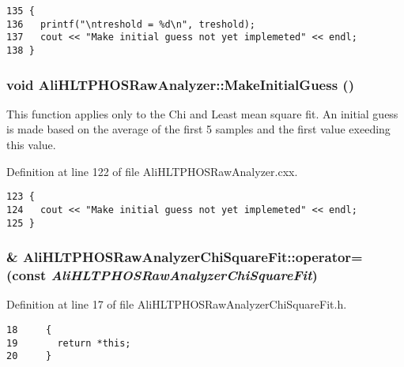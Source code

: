 \footnotesize\begin{verbatim}135 {
136   printf("\ntreshold = %d\n", treshold);
137   cout << "Make initial guess not yet implemeted" << endl;  
138 }
\end{verbatim}\normalsize 


\subsubsection{\setlength{\rightskip}{0pt plus 5cm}void Ali\-HLTPHOSRaw\-Analyzer::Make\-Initial\-Guess ()\hspace{0.3cm}{\tt  [inherited]}}\label{classAliHLTPHOSRawAnalyzer_AliHLTPHOSRawAnalyzerPeakFindera14}


This function applies only to the Chi and Least mean square fit. An initial guess is made based on the average of the first 5 samples and the first value exeeding this value. 

Definition at line 122 of file Ali\-HLTPHOSRaw\-Analyzer.cxx.

\footnotesize\begin{verbatim}123 {
124   cout << "Make initial guess not yet implemeted" << endl;
125 }
\end{verbatim}\normalsize 


\subsubsection{\& Ali\-HLTPHOSRaw\-Analyzer\-Chi\-Square\-Fit::operator= (const  {\em Ali\-HLTPHOSRaw\-Analyzer\-Chi\-Square\-Fit})\hspace{0.3cm}{\tt  [inline]}}\label{classAliHLTPHOSRawAnalyzerChiSquareFit_AliHLTPHOSRawAnalyzerChiSquareFita2}




Definition at line 17 of file Ali\-HLTPHOSRaw\-Analyzer\-Chi\-Square\-Fit.h.

\footnotesize\begin{verbatim}18     {
19       return *this; 
20     }
\end{verbatim}\normalsize 


